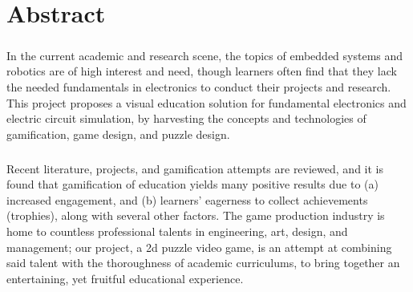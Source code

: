 \chapter*{Abstract}
\paragraph*{}
In the current academic and research scene, the topics of embedded systems and robotics are of high interest and need, though learners often find that they lack the needed fundamentals in electronics to conduct their projects and research. This project proposes a visual education solution for fundamental electronics and electric circuit simulation, by harvesting the concepts and technologies of gamification, game design, and puzzle design.

\paragraph*{}
Recent literature, projects, and gamification attempts are reviewed, and it is found that gamification of education yields many positive results due to (a) increased engagement, and (b) learners’ eagerness to collect achievements (trophies), along with several other factors. The game production industry is home to countless professional talents in engineering, art, design, and management; our project, a \acrshort{2d} puzzle video game, is an attempt at combining said talent with the thoroughness of academic curriculums, to bring together an entertaining, yet fruitful educational experience.